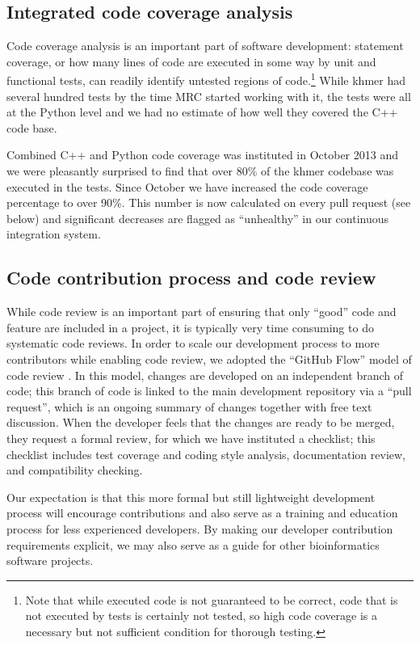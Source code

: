 \documentclass[11pt]{article}
\begin{document}

\subsection{Integrated code coverage analysis}

Code coverage analysis is an important part of software development:
statement coverage, or how many lines of code are executed in some way
by unit and functional tests, can readily identify untested regions of
code.\footnote{Note that while executed code is not guaranteed to be
  correct, code that is not executed by tests is certainly not tested,
  so high code coverage is a necessary but not sufficient condition
  for thorough testing.}  While khmer had several hundred tests by the
time MRC started working with it, the tests were all at the Python
level and we had no estimate of how well they covered the C++ code
base.

Combined C++ and Python code coverage was instituted in October 2013
and we were pleasantly surprised to find that over 80\% of the khmer
codebase was executed in the tests.  Since October we have increased
the code coverage percentage to over 90\%. This number is now
calculated on every pull request (see below) and significant decreases
are flagged as ``unhealthy'' in our continuous integration system.

\subsection{Code contribution process and code review}

While code review is an important part of ensuring that only ``good''
code and feature are included in a project, it is typically very time
consuming to do systematic code reviews.  In order to scale our
development process to more contributors while enabling code review,
we adopted the ``GitHub Flow'' model of code review \cite{GitHubFlow}.
In this model, changes are developed on an independent branch
of code; this branch of code is linked to the main development
repository via a ``pull request'', which is an ongoing summary of
changes together with free text discussion.  When the developer feels
that the changes are ready to be merged, they request a formal review,
for which we have instituted a checklist; this checklist includes test
coverage and coding style analysis, documentation review, and
compatibility checking.

Our expectation is that this more formal but still lightweight
development process will encourage contributions and also serve as a
training and education process for less experienced developers.  By
making our developer contribution requirements explicit, we may also
serve as a guide for other bioinformatics software projects.
\end{document}
